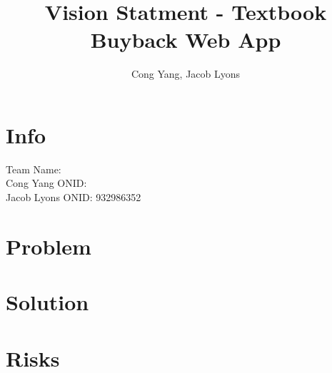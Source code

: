 \documentclass[12pt]{article}
\title{Vision Statment - Textbook Buyback Web App}
\author{Cong Yang, Jacob Lyons}
\begin{document}
	\maketitle

	\tableofcontents
                \section{Info}
		Team Name:      \\
		Cong Yang ONID: \\
		Jacob Lyons ONID: 932986352 \\


	\section{Problem}

		


	\section{Solution}



		

	\section{Risks}
\end{document}
